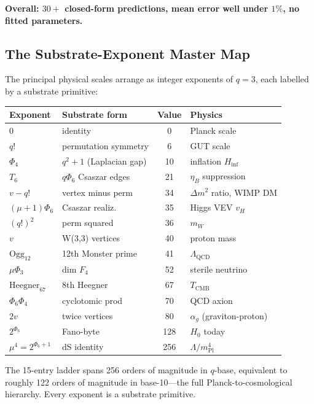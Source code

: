\documentclass[11pt]{article}
\newcommand{\mPl}{m_{\mathrm{Pl}}}
\begin{document}
\textbf{Overall: $30+$ closed-form predictions, mean error well under $1\%$,
no fitted parameters.}

\subsection*{The Substrate-Exponent Master Map}

The principal physical scales arrange as integer exponents of $q = 3$,
each labelled by a substrate primitive:

\begin{center}\footnotesize
\begin{tabular}{l|l|c|l}
\toprule
\textbf{Exponent} & \textbf{Substrate form} & \textbf{Value} & \textbf{Physics} \\
\midrule
$0$    & identity                 & 0   & Planck scale \\
$q!$   & permutation symmetry     & 6   & GUT scale \\
$\Phi_4$ & $q^2+1$ (Laplacian gap) & 10  & inflation $H_{\mathrm{inf}}$ \\
$T_6$  & $q\Phi_6$ Csaszar edges  & 21  & $\eta_B$ suppression \\
$v - q!$ & vertex minus perm     & 34  & $\Delta m^2$ ratio, WIMP DM \\
$(\mu+1)\Phi_6$ & Csaszar realiz. & 35  & Higgs VEV $v_H$ \\
$(q!)^2$ & perm squared           & 36  & $m_W$ \\
$v$    & W(3,3) vertices          & 40  & proton mass \\
$\mathrm{Ogg}_{12}$ & 12th Monster prime & 41 & $\Lambda_{\mathrm{QCD}}$ \\
$\mu \Phi_3$ & dim $F_4$           & 52  & sterile neutrino \\
$\mathrm{Heegner}_{67}$ & 8th Heegner & 67 & $T_{\mathrm{CMB}}$ \\
$\Phi_6 \Phi_4$ & cyclotomic prod & 70  & QCD axion \\
$2v$   & twice vertices            & 80  & $\alpha_g$ (graviton-proton) \\
$2^{\Phi_6}$ & Fano-byte            & 128 & $H_0$ today \\
$\mu^4 = 2^{\Phi_6+1}$ & dS identity & 256 & $\Lambda/\mPl^4$ \\
\bottomrule
\end{tabular}
\end{center}

The 15-entry ladder spans 256 orders of magnitude in $q$-base, equivalent
to roughly 122 orders of magnitude in base-10---the full Planck-to-cosmological
hierarchy.  Every exponent is a substrate primitive.
\end{document}
